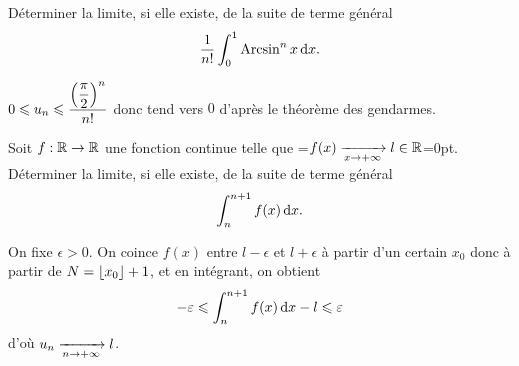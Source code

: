 \documentclass{magnolia}
\begin{document}
\begin{exos}
\exo[utile=2] Déterminer la limite, si elle existe, de la suite de terme général
  \[\frac{1}{n!}\int_{0}^{1} \operatorname{Arcsin}^n x\,\text{d}x.\]
  \begin{sol}$0\leqslant u_n\leqslant \dfrac{\left(\dfrac{\pi}{2}\right)^n}{n!}$ donc tend vers $0$ d'après le théorème des gendarmes.
  \end{sol}
\exo[utile=2] Soit $f:\mathbb{R}\to\mathbb{R}$ une fonction continue telle que
  =\hbox{$f(x)\xrightarrow[x\rightarrow +\infty]{} l\in\mathbb{R}$}=0pt. Déterminer la limite, si elle existe, de la suite de terme général
  \[\int_{n}^{n+1} f(x)\,\text{d}x.\]
  \begin{sol}
  On fixe $\epsilon>0$. On coince $f(x)$ entre $l-\epsilon$ et $l+\epsilon$ à partir d'un certain $x_0$ donc à partir de $N=\left\lfloor x_0\right\rfloor+1$, et en intégrant, on obtient $$-\varepsilon\leqslant \int_{n}^{n+1} f(x)\,\text{d}x-l\leqslant \varepsilon$$ d'où $u_n\xrightarrow[n\rightarrow +\infty]{}l$.
  \end{sol}
\end{exos}
\end{document}
